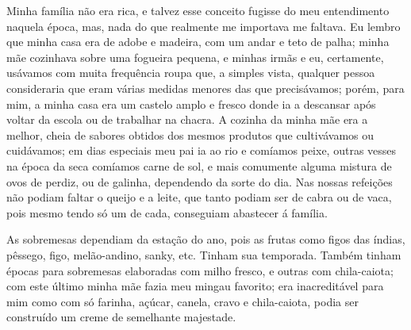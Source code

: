 Minha família não era rica, e talvez esse conceito fugisse do meu entendimento naquela época, mas, nada do que realmente me importava me faltava.
Eu lembro que minha casa era de adobe e madeira, com um andar e teto de palha; minha mãe cozinhava sobre uma fogueira pequena, e minhas irmãs e eu, certamente, usávamos com muita frequência roupa que, a simples vista, qualquer pessoa consideraria que eram várias medidas menores das que precisávamos;
porém, para mim, a minha casa era um castelo amplo e fresco donde ia a descansar após voltar da escola ou de trabalhar na chacra. 
A cozinha da minha mãe era a melhor, cheia de sabores obtidos dos mesmos produtos que cultivávamos ou cuidávamos; em dias especiais meu pai ia ao rio e comíamos peixe, outras vesses na época da seca comíamos carne de sol, e mais comumente alguma mistura de ovos de perdiz, ou de galinha, dependendo da sorte do dia.
Nas nossas refeições não podiam faltar o queijo e a leite, que tanto podiam ser de cabra ou de vaca, pois mesmo tendo só um de cada, conseguiam abastecer á família.
\begin{comment}
\begin{wrapfigure}{r}{0.35\textwidth}
  \vspace{-10pt}
  \begin{center}
    \texttt{[image: opuntia.eps]}
    \caption{Figo das índias.}
  \end{center}
  \vspace{-30pt}
\end{wrapfigure}
\end{comment}
As sobremesas dependiam da estação do ano, pois as frutas como figos das índias, pêssego, figo, melão-andino, sanky, etc. Tinham sua temporada. Também tinham épocas para sobremesas elaboradas com milho fresco, e outras com chila-caiota; com este último minha mãe fazia meu mingau favorito; era inacreditável para mim como com só farinha, açúcar, canela, cravo e chila-caiota, podia ser construído um creme de semelhante majestade.

